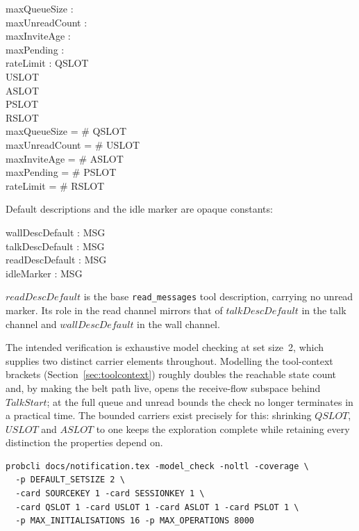 \documentclass[a4paper,10pt,fleqn]{article}
\begin{document}
\begin{axdef}
  maxQueueSize : \nat \\
  maxUnreadCount : \nat \\
  maxInviteAge : \nat \\
  maxPending : \nat \\
  rateLimit : \nat
  \where
  QSLOT \neq \emptyset \\
  USLOT \neq \emptyset \\
  ASLOT \neq \emptyset \\
  PSLOT \neq \emptyset \\
  RSLOT \neq \emptyset \\
  maxQueueSize = \# QSLOT \\
  maxUnreadCount = \# USLOT \\
  maxInviteAge = \# ASLOT \\
  maxPending = \# PSLOT \\
  rateLimit = \# RSLOT
\end{axdef}

Default descriptions and the idle marker are opaque constants:

\begin{axdef}
  wallDescDefault : MSG \\
  talkDescDefault : MSG \\
  readDescDefault : MSG \\
  idleMarker : MSG
\end{axdef}

$readDescDefault$ is the base \texttt{read\_messages} tool description,
carrying no unread marker.  Its role in the read channel mirrors that of
$talkDescDefault$ in the talk channel and $wallDescDefault$ in the wall
channel.

The intended verification is exhaustive model checking at set size~2,
which supplies two distinct carrier elements throughout.  Modelling the
tool-context brackets (Section~\ref{sec:toolcontext}) roughly doubles the
reachable state count and, by making the belt path live, opens the
receive-flow subspace behind $TalkStart$; at the full queue and unread
bounds the check no longer terminates in a practical time.  The bounded
carriers exist precisely for this: shrinking $QSLOT$, $USLOT$ and $ASLOT$
to one keeps the exploration complete while retaining every distinction
the properties depend on.

\begin{verbatim}
probcli docs/notification.tex -model_check -noltl -coverage \
  -p DEFAULT_SETSIZE 2 \
  -card SOURCEKEY 1 -card SESSIONKEY 1 \
  -card QSLOT 1 -card USLOT 1 -card ASLOT 1 -card PSLOT 1 \
  -p MAX_INITIALISATIONS 16 -p MAX_OPERATIONS 8000
\end{verbatim}
\end{document}
